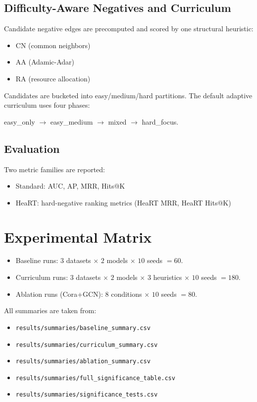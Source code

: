 \documentclass[11pt]{article}
\begin{document}
\subsection{Difficulty-Aware Negatives and Curriculum}

Candidate negative edges are precomputed and scored by one structural heuristic:
\begin{itemize}
\item CN (common neighbors)
\item AA (Adamic-Adar)
\item RA (resource allocation)
\end{itemize}

Candidates are bucketed into easy/medium/hard partitions. The default adaptive curriculum uses four phases:
\begin{center}
easy\_only $\rightarrow$ easy\_medium $\rightarrow$ mixed $\rightarrow$ hard\_focus.
\end{center}

\subsection{Evaluation}

Two metric families are reported:
\begin{itemize}
\item Standard: AUC, AP, MRR, Hits@K
\item HeaRT: hard-negative ranking metrics (HeaRT MRR, HeaRT Hits@K)
\end{itemize}

\section{Experimental Matrix}

\begin{itemize}
\item Baseline runs: $3$ datasets $\times$ $2$ models $\times$ $10$ seeds $= 60$.
\item Curriculum runs: $3$ datasets $\times$ $2$ models $\times$ $3$ heuristics $\times$ $10$ seeds $= 180$.
\item Ablation runs (Cora+GCN): $8$ conditions $\times$ $10$ seeds $= 80$.
\end{itemize}

All summaries are taken from:
\begin{itemize}
\item \texttt{results/summaries/baseline\_summary.csv}
\item \texttt{results/summaries/curriculum\_summary.csv}
\item \texttt{results/summaries/ablation\_summary.csv}
\item \texttt{results/summaries/full\_significance\_table.csv}
\item \texttt{results/summaries/significance\_tests.csv}
\end{itemize}
\end{document}
